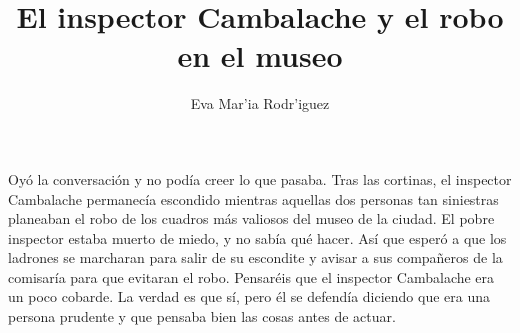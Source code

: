 \documentclass{article}
\begin{document}
	\title{El inspector Cambalache y el robo en el museo}
	\author{Eva Mar'ia Rodr'iguez}
	\maketitle
	Oy\'o la conversaci\'on y no pod\'ia creer lo que pasaba. Tras las cortinas, el inspector 
	Cambalache permanec\'ia escondido mientras aquellas dos personas tan siniestras planeaban 
	el robo de los cuadros m\'as valiosos del museo de la ciudad. El pobre inspector estaba 
	muerto de miedo, y no sab\'ia qu\'e hacer. As\'i que esper\'o a que los ladrones se marcharan 
	para salir de su escondite y avisar a sus compa\~neros de la comisar\'ia para que evitaran 
	el robo. Pensar\'eis que el inspector Cambalache era un poco cobarde. La verdad es que s\'i, 
	pero \'el se defend\'ia diciendo que era una persona prudente y que pensaba bien las cosas 
	antes de actuar.
\end{document}
